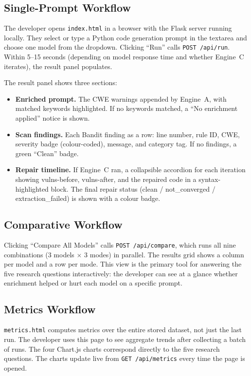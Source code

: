 \documentclass[12pt,a4paper]{report}
\begin{document}
\subsection{Single-Prompt Workflow}

The developer opens \texttt{index.html} in a browser with the Flask server
running locally. They select or type a Python code generation prompt in the
textarea and choose one model from the dropdown. Clicking ``Run'' calls
\texttt{POST /api/run}. Within 5--15 seconds (depending on model response time
and whether Engine~C iterates), the result panel populates.

The result panel shows three sections:

\begin{itemize}
  \item \textbf{Enriched prompt.} The CWE warnings appended by Engine~A, with
        matched keywords highlighted. If no keywords matched, a ``No enrichment
        applied'' notice is shown.
  \item \textbf{Scan findings.} Each Bandit finding as a row: line number,
        rule ID, CWE, severity badge (colour-coded), message, and category tag.
        If no findings, a green ``Clean'' badge.
  \item \textbf{Repair timeline.} If Engine~C ran, a collapsible accordion for
        each iteration showing vulns-before, vulns-after, and the repaired code
        in a syntax-highlighted block. The final repair status (clean /
        not\_converged / extraction\_failed) is shown with a colour badge.
\end{itemize}

\subsection{Comparative Workflow}

Clicking ``Compare All Models'' calls \texttt{POST /api/compare}, which runs all
nine combinations (3 models $\times$ 3 modes) in parallel. The results grid
shows a column per model and a row per mode. This view is the primary tool for
answering the five research questions interactively: the developer can see at a
glance whether enrichment helped or hurt each model on a specific prompt.

\subsection{Metrics Workflow}

\texttt{metrics.html} computes metrics over the entire stored dataset, not just
the last run. The developer uses this page to see aggregate trends after
collecting a batch of runs. The four Chart.js charts correspond directly to the
five research questions. The charts update live from \texttt{GET /api/metrics}
every time the page is opened.
\end{document}
